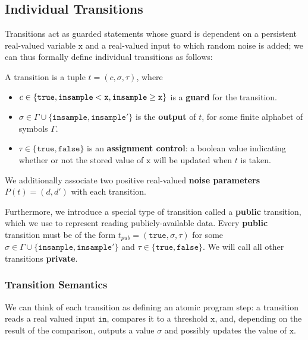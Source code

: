 
\subsection{Individual Transitions}

Transitions act as guarded statements whose guard is dependent on a persistent real-valued variable $\texttt{x}$ and a real-valued input to which random noise is added; we can thus formally define individual transitions as follows:

\begin{defn}[Transitions]\label{svTransDef}
    A transition is a tuple $t = (c, \sigma, \tau)$, where \begin{itemize}
        \item $c\in \{\texttt{true}, \lguard[\texttt{x}], \gguard[\texttt{x}]\}$ is a \textbf{guard} for the transition.
        \item $\sigma \in \Gamma\cup\{\texttt{insample}, \texttt{insample}'\}$ is the \textbf{output} of $t$, for some finite alphabet of symbols $\Gamma$.
        \item $\tau\in\{\texttt{true}, \texttt{false}\}$ is an \textbf{assignment control}: a boolean value indicating whether or not the stored value of $\texttt{x}$ will be updated when $t$ is taken.
    \end{itemize}
\end{defn}

We additionally associate two positive real-valued \textbf{noise parameters} $P(t) = (d, d')$ with each transition. 

Furthermore, we introduce a special type of transition called a \textbf{public} transition, which we use to represent reading publicly-available data. Every \textbf{public} transition must be of the form $t_{pub}= (\texttt{true}, \sigma, \tau)$ for some $\sigma \in \Gamma\cup\{\texttt{insample}, \texttt{insample}'\}$ and $\tau \in \{\texttt{true}, \texttt{false}\}$. We will call all other transitions \textbf{private}. 

\subsubsection{Transition Semantics}

We can think of each transition as defining an atomic program step: a transition reads a real valued input $\texttt{in}$, compares it to a threshold $\texttt{x}$, and, depending on the result of the comparison, outputs a value $\sigma$ and possibly updates the value of $\texttt{x}$.

